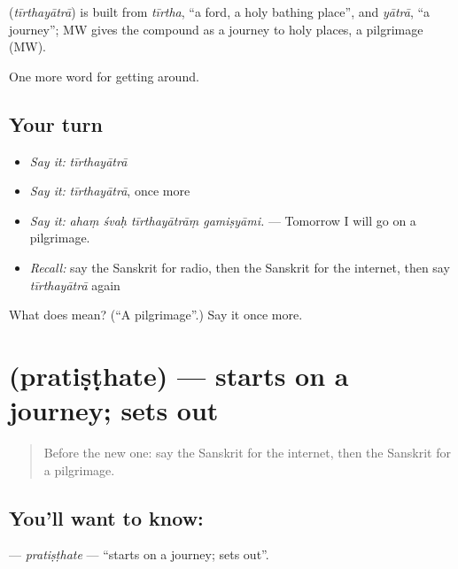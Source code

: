 \begin{cousinweb}
\textbf{} (\emph{tīrthayātrā}) is built from \emph{tīrtha}, \textquotedblleft{}a ford, a holy bathing place\textquotedblright{}, and \emph{yātrā}, \textquotedblleft{}a journey\textquotedblright{}; MW gives the compound as a journey to holy places, a pilgrimage (MW).
\end{cousinweb}

\begin{grammarlens}[title={What you've built}]
One more word for getting around.
\end{grammarlens}

\subsection*{Your turn}
\begin{itemize}
\raggedright
  \item \emph{Say it:} \emph{tīrthayātrā}
  \item \emph{Say it:} \emph{tīrthayātrā}, once more
  \item \emph{Say it:} \emph{ahaṃ śvaḥ tīrthayātrāṃ gamiṣyāmi.} — Tomorrow I will go on a pilgrimage.
  \item \emph{Recall:} say the Sanskrit for radio, then the Sanskrit for the internet, then say \emph{tīrthayātrā} again
\end{itemize}

\begin{tcolorbox}[breakable,colback=teal!4,colframe=teal!35!black,title={Before you move on}]
What does  mean? (\textquotedblleft{}A pilgrimage\textquotedblright{}.) Say it once more.
\end{tcolorbox}
\section[\texorpdfstring{\sk{प्रतिष्ठते} (pratiṣṭhate)}{प्रतिष्ठते (pratiṣṭhate)}]{ (pratiṣṭhate) — starts on a journey; sets out}

\label{lesson:SA-C394-pratisthate}



\begin{quote}
Before the new one: say the Sanskrit for the internet, then the Sanskrit for a pilgrimage.
\end{quote}

\subsection*{You'll want to know: }
\textbf{} — \emph{pratiṣṭhate} — \textquotedblleft{}starts on a journey; sets out\textquotedblright{}.

